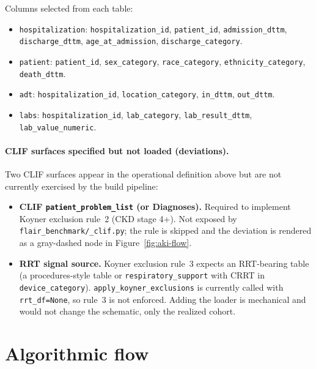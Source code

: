 \documentclass[11pt]{article}
\begin{document}
Columns selected from each table:
\begin{itemize}[leftmargin=2em, itemsep=0pt]
  \item \texttt{hospitalization}: \texttt{hospitalization\_id},
        \texttt{patient\_id}, \texttt{admission\_dttm},
        \texttt{discharge\_dttm}, \texttt{age\_at\_admission},
        \texttt{discharge\_category}.
  \item \texttt{patient}: \texttt{patient\_id},
        \texttt{sex\_category}, \texttt{race\_category},
        \texttt{ethnicity\_category}, \texttt{death\_dttm}.
  \item \texttt{adt}: \texttt{hospitalization\_id},
        \texttt{location\_category}, \texttt{in\_dttm},
        \texttt{out\_dttm}.
  \item \texttt{labs}: \texttt{hospitalization\_id},
        \texttt{lab\_category}, \texttt{lab\_result\_dttm},
        \texttt{lab\_value\_numeric}.
\end{itemize}

\paragraph{CLIF surfaces specified but not loaded (deviations).}
Two CLIF surfaces appear in the operational definition above but are
not currently exercised by the build pipeline:
\begin{itemize}[leftmargin=2em, itemsep=0pt]
  \item \textbf{CLIF \texttt{patient\_problem\_list} (or Diagnoses).}
        Required to implement Koyner exclusion rule~2 (CKD stage 4+).
        Not exposed by \texttt{flair\_benchmark/\_clif.py}; the rule is
        skipped and the deviation is rendered as a gray-dashed node in
        Figure~\ref{fig:aki-flow}.
  \item \textbf{RRT signal source.} Koyner exclusion rule~3 expects
        an RRT-bearing table (a procedures-style table or
        \texttt{respiratory\_support} with CRRT in
        \texttt{device\_category}). \texttt{apply\_koyner\_exclusions}
        is currently called with \texttt{rrt\_df=None}, so rule~3 is
        not enforced. Adding the loader is mechanical and would not
        change the schematic, only the realized cohort.
\end{itemize}

\section{Algorithmic flow}
\label{sec:flow}
\end{document}
